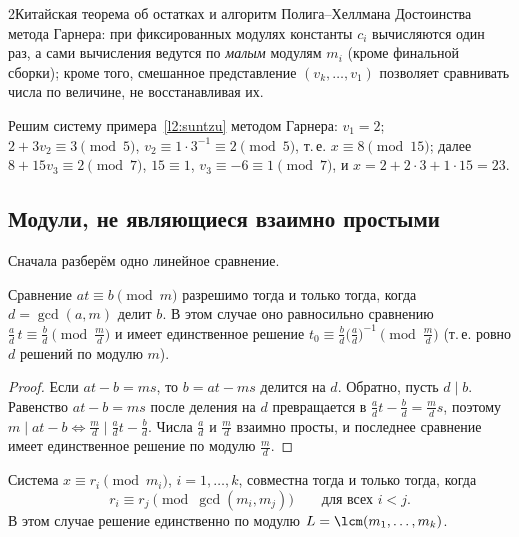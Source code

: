 \begin{lecture}{2}{Китайская теорема об остатках и алгоритм Полига–Хеллмана}
Достоинства метода Гарнера: при фиксированных модулях константы $c_i$ вычисляются один раз,
а сами вычисления ведутся по \emph{малым} модулям $m_i$ (кроме финальной сборки); кроме того,
смешанное представление $(v_k, \dots, v_1)$ позволяет сравнивать числа по величине, не
восстанавливая их.

\begin{example}
Решим систему примера~\ref{l2:suntzu} методом Гарнера: $v_1 = 2$; $2 + 3v_2 \equiv 3 \pmod 5$,
$v_2 \equiv 1 \cdot 3^{-1} \equiv 2 \pmod 5$, т.\,е. $x \equiv 8 \pmod{15}$; далее
$8 + 15 v_3 \equiv 2 \pmod 7$, $15 \equiv 1$, $v_3 \equiv -6 \equiv 1 \pmod 7$, и
$x = 2 + 2 \cdot 3 + 1 \cdot 15 = 23$.
\end{example}


\subsection{Модули, не являющиеся взаимно простыми}

Сначала разберём одно линейное сравнение.

\begin{lemma}\label{l2:linear}
Сравнение $at \equiv b \pmod m$ разрешимо тогда и только тогда, когда $d = \gcd(a, m)$ делит
$b$. В этом случае оно равносильно сравнению $\frac ad\, t \equiv \frac bd \pmod{\frac md}$ и имеет
единственное решение $t_0 \equiv \frac bd \bigl(\frac ad\bigr)^{-1} \pmod{\frac md}$
(т.\,е. ровно $d$ решений по модулю $m$).
\end{lemma}

\begin{proof}
Если $at - b = ms$, то $b = at - ms$ делится на $d$. Обратно, пусть $d \mid b$. Равенство
$at - b = ms$ после деления на $d$ превращается в $\frac ad t - \frac bd = \frac md s$, поэтому
$m \mid at - b \iff \frac md \mid \frac ad t - \frac bd$. Числа $\frac ad$ и $\frac md$ взаимно
просты, и последнее сравнение имеет единственное решение по модулю $\frac md$.
\end{proof}

\begin{theorem}\label{l2:crt-general}
Система $x \equiv r_i \pmod{m_i}$, $i = 1, \dots, k$, совместна тогда и только тогда, когда
\[
  r_i \equiv r_j \pmod{\gcd(m_i, m_j)} \qquad \text{для всех } i < j.
\]
В этом случае решение единственно по модулю $L = \lcm(m_1, \dots, m_k)$.
\end{theorem}


\end{lecture}
